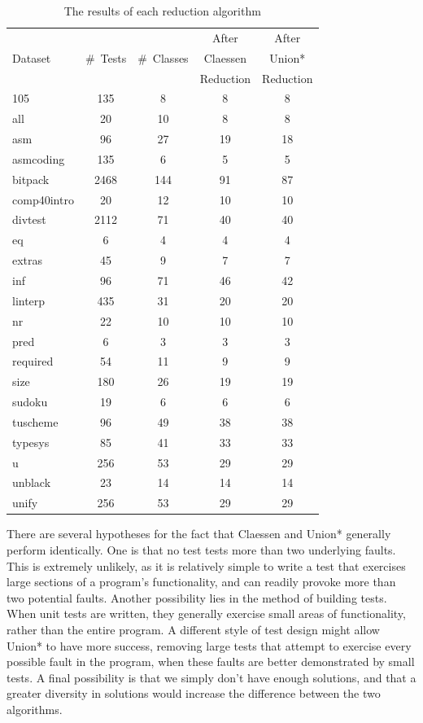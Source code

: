 \documentclass[11pt,twoside]{article}
\theoremstyle{definition}
\begin{document}
\begin{table}[t]
\def\?{\phantom0}
\centering

\begin{tabular}{ | l | c | c | c | c | }
\hline
        &          &             &   After   & After \\ 
Dataset & \#~Tests & \#\ Classes &  Claessen &  Union*  \\ 
     &            &             & Reduction & Reduction \\
\hline
105 & \?135 & \?\?8 & \?8 & \?8 \\
all & \?\?20 & \?10 & \?8 & \?8 \\
asm & \?\?96 & \?27 & 19 & 18 \\
asmcoding & \?135 & \?\?6 & \?5 & \?5 \\
bitpack & 2468 & 144 & 91 & 87 \\
comp40intro & \?\?20 & \?12 & 10 & 10 \\
divtest & 2112 & \?71 & 40 & 40 \\
eq & \?\?\?6 & \?\?4 & \?4 & \?4 \\
extras & \?\?45 & \?\?9 & \?7 & \?7 \\
inf & \?\?96 & \?71 & 46 & 42 \\
linterp & \?435 & \?31 & 20 & 20 \\
nr & \?\?22 & \?10 & 10 & 10 \\
pred & \?\?\?6 & \?\?3 & \?3 & \?3 \\
required & \?\?54 & \?11 & \?9 & \?9 \\
size & \?180 & \?26 & 19 & 19 \\
sudoku & \?19 & \?\?6 & \?6 & \?6 \\
tuscheme & \?\?96 & \?49 & 38 & 38 \\
typesys & \?\?85 & \?41 & 33 & 33 \\
u & \?256 & \?53 & 29 & 29 \\
unblack & \?23 & \?14 & 14 & 14 \\
unify & \?256 & \?53 & 29 & 29 \\
\hline
\end{tabular}
\caption{The results of each reduction algorithm}
\end{table}

There are several hypotheses for the fact that Claessen and Union* generally perform identically. One is that no test tests more than two underlying faults. This is extremely unlikely, as it is relatively simple to write a test that exercises large sections of a program's functionality, and can readily provoke more than two potential faults. Another possibility lies in the method of building tests. When unit tests are written, they generally exercise small areas of functionality, rather than the entire program. A different style of test design might allow Union* to have more success, removing large tests that attempt to exercise every possible fault in the program, when these faults are better demonstrated by small tests. A final possibility is that we simply don't have enough solutions, and that a greater diversity in solutions would increase the difference between the two algorithms.
\end{document}
